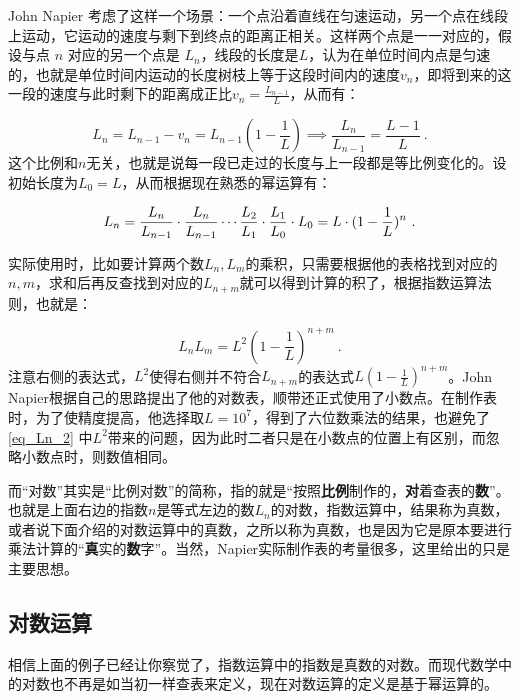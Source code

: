 John Napier 考虑了这样一个场景：一个点沿着直线在匀速运动，另一个点在线段上运动，它运动的速度与剩下到终点的距离正相关。这样两个点是一一对应的，假设与点 $n$ 对应的另一个点是 $L_n$，线段的长度是$L$，认为在单位时间内点是匀速的，也就是单位时间内运动的长度树枝上等于这段时间内的速度$v_n$，即将到来的这一段的速度与此时剩下的距离成正比$\displaystyle v_{n}=\frac{L_{n-1}}{L}$，从而有：

\begin{equation}
L_{n}=L_{n-1}-v_{n}=L_{n-1}(1-\frac{1}{L})\implies\frac{L_{n}}{L_{n-1}}= \frac{L-1}{L}~.
\end{equation}
这个比例和$n$无关，也就是说每一段已走过的长度与上一段都是等比例变化的。设初始长度为$L_{0}=L$，从而根据现在熟悉的幂运算有：

\begin{equation}\label{eq_Ln_1}
L_n={L_{n}\over L_{n-1}}\cdot{L_{n}\over L_{n-1}}\cdots{L_{2}\over L_{1}}\cdot{L_{1}\over L_{0}}\cdot L_0=L\cdot(1 - \frac{1}{L})^n~.
\end{equation}

实际使用时，比如要计算两个数$L_n,L_m$的乘积，只需要根据他的表格找到对应的$n,m$，求和后再反查找到对应的$L_{n+m}$就可以得到计算的积了，根据指数运算法则，也就是：

\begin{equation}\label{eq_Ln_2}
L_nL_m=L^2(1 - \frac{1}{L})^{n+m}~.
\end{equation}
注意右侧的表达式，$L^2$使得右侧并不符合$L_{n+m}$的表达式$\displaystyle L(1 - \frac{1}{L})^{n+m}$。John Napier根据自己的思路提出了他的对数表，顺带还正式使用了小数点。在制作表时，为了使精度提高，他选择取$L=10^7$，得到了六位数乘法的结果，也避免了\autoref{eq_Ln_2} 中$L^2$带来的问题，因为此时二者只是在小数点的位置上有区别，而忽略小数点时，则数值相同。

而“对数”其实是“比例对数”的简称，指的就是“按照\textbf{比例}制作的，\textbf{对}着查表的\textbf{数}”。也就是上面右边的指数$n$是等式左边的数$L_n$的对数，指数运算中，结果称为真数，或者说下面介绍的对数运算中的真数，之所以称为真数，也是因为它是原本要进行乘法计算的“\textbf{真}实的\textbf{数}字”。当然，Napier实际制作表的考量很多，这里给出的只是主要思想。

\subsection{对数运算}

相信上面的例子已经让你察觉了，指数运算中的指数是真数的对数。而现代数学中的对数也不再是如当初一样查表来定义，现在对数运算的定义是基于幂运算的。


